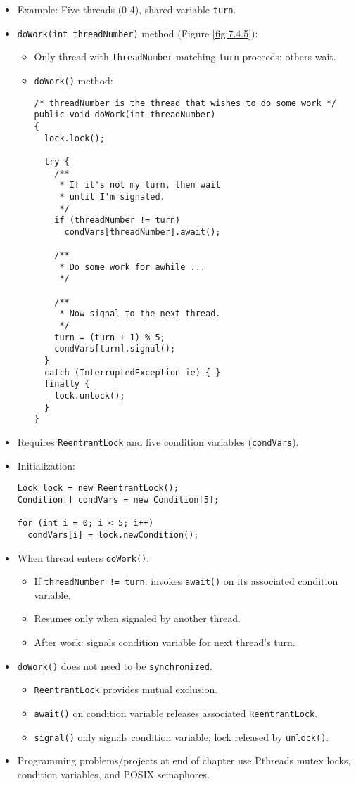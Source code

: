 \begin{itemize}
\begin{itemize}
    \end{itemize}
    \item Example: Five threads (0-4), shared variable \texttt{turn}.
    \item \texttt{doWork(int threadNumber)} method (Figure \ref{fig:7.4.5}):
    \begin{itemize}
        \item Only thread with \texttt{threadNumber} matching \texttt{turn} proceeds; others wait.
        \item \texttt{doWork()} method:
        \begin{verbatim}
/* threadNumber is the thread that wishes to do some work */
public void doWork(int threadNumber)
{
  lock.lock();
 
  try {
    /**
     * If it's not my turn, then wait
     * until I'm signaled.
     */
    if (threadNumber != turn)
      condVars[threadNumber].await();
 
    /**
     * Do some work for awhile ...
     */
 
    /**
     * Now signal to the next thread.
     */
    turn = (turn + 1) % 5;
    condVars[turn].signal();
  }
  catch (InterruptedException ie) { }
  finally {
    lock.unlock();
  }
}
        \end{verbatim}
    \end{itemize}
    \item Requires \texttt{ReentrantLock} and five condition variables (\texttt{condVars}).
    \item Initialization:
    \begin{verbatim}
Lock lock = new ReentrantLock();
Condition[] condVars = new Condition[5];
 
for (int i = 0; i < 5; i++)
  condVars[i] = lock.newCondition();
    \end{verbatim}
    \item When thread enters \texttt{doWork()}:
    \begin{itemize}
        \item If \texttt{threadNumber != turn}: invokes \texttt{await()} on its associated condition variable.
        \item Resumes only when signaled by another thread.
        \item After work: signals condition variable for next thread's turn.
    \end{itemize}
    \item \texttt{doWork()} does not need to be \texttt{synchronized}.
    \begin{itemize}
        \item \texttt{ReentrantLock} provides mutual exclusion.
        \item \texttt{await()} on condition variable releases associated \texttt{ReentrantLock}.
        \item \texttt{signal()} only signals condition variable; lock released by \texttt{unlock()}.
    \end{itemize}
    \item Programming problems/projects at end of chapter use Pthreads mutex locks, condition variables, and POSIX semaphores.
\end{itemize}

